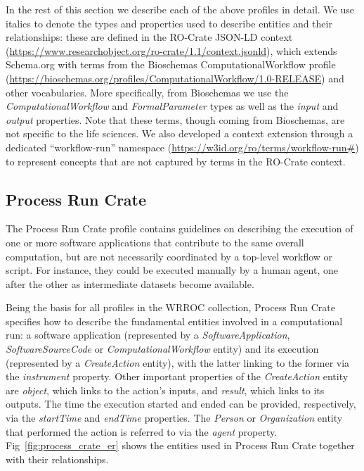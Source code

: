 \documentclass[10pt,letterpaper]{article}
\begin{document}
In the rest of this section we describe each of the above profiles in detail.
We use italics to denote the types and properties used to describe entities and their relationships: these are defined in the RO-Crate JSON-LD context (\url{https://www.researchobject.org/ro-crate/1.1/context.jsonld}), which extends Schema.org with terms from the Bioschemas \cite{Gray 2017} ComputationalWorkflow profile (\url{https://bioschemas.org/profiles/ComputationalWorkflow/1.0-RELEASE}) and other vocabularies. More specifically, from Bioschemas we use the \emph{ComputationalWorkflow} and \emph{FormalParameter} types as well as the \emph{input} and \emph{output} properties. 
Note that these terms, though coming from Bioschemas, are not specific to the life sciences.
We also developed a context extension through a dedicated ``workflow-run'' namespace (\url{https://w3id.org/ro/terms/workflow-run\#}) to represent concepts that are not captured by terms in the RO-Crate context.

\subsection{Process Run Crate}\label{process-run-crate}

The Process Run Crate profile contains guidelines on describing the execution of one or more software applications that contribute to the same overall computation, but are not necessarily coordinated by a top-level workflow or script.
For instance, they could be executed manually by a human agent, one after the other as intermediate datasets become available.

Being the basis for all profiles in the WRROC collection, Process Run Crate specifies how to describe the fundamental entities involved in a computational run: a software application (represented by a
\emph{SoftwareApplication}, \emph{SoftwareSourceCode} or
\emph{ComputationalWorkflow} entity) and its execution (represented by a \emph{CreateAction} entity), with the latter linking to the former via the \emph{instrument} property.
Other important properties of the
\emph{CreateAction} entity are \emph{object}, which links to the action's inputs, and \emph{result}, which links to its outputs.
The time the execution started and ended can be provided, respectively, via the
\emph{startTime} and \emph{endTime} properties.
The \emph{Person} or
\emph{Organization} entity that performed the action is referred to via the \emph{agent} property.
Fig~\ref{fig:process_crate_er} shows the entities used in Process Run Crate together with their relationships.
\end{document}
